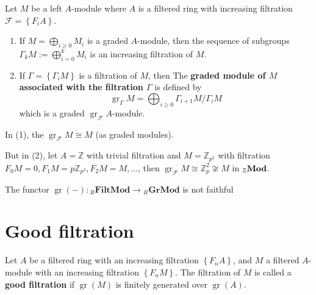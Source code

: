\documentclass[12pt, oneside]{book}
\begin{document}
\begin{proposition}
    Let $M$ be a left $A$-module where $A$ is a filtered ring with increasing filtration $\mathcal{F}=\left\{F_iA\right\}$.
    \begin{enumerate}
        \item
              If $M=\bigoplus_{i\geq 0} M_i$ is a graded $A$-module, then the sequence of subgroups $\Gamma_kM:=\bigoplus_{i=0}^k M_i$ is an increasing filtration of $M$.
        \item
              If $\Gamma=\left\{\Gamma_iM\right\}$ is a filtration of $M$, then
              The \textbf{graded module of $M$ associated with the filtration $\Gamma$} is defined by
              \begin{equation*}
                  \operatorname{gr}_{\Gamma}M
                  =
                  \bigoplus_{i\geq 0} \Gamma_{i+1}M / \Gamma_i M
              \end{equation*}
              which is a graded $\operatorname{gr}_{\mathcal{F}}A$-module.
    \end{enumerate}
    \begin{remark}
        In (1), the  $\operatorname{gr}_{\mathcal{F}}M\cong M$ (as graded modules).

        But in (2), let $A=\mathbb{Z}$ with trivial filtration and $M=\mathbb{Z}_{p^2}$ with filtration $F_0M=0, F_1M=p \mathbb{Z}_{p^2}, F_2M=M,\ldots$, then $\operatorname{gr}_{\mathcal{F}}M \cong \mathbb{Z}_p^2\not \cong M$ in ${}_\mathbb{Z}\mathbf{Mod}$.

        The functor $\operatorname{gr}(-):  {}_R \mathbf{FiltMod}\rightarrow {}_R\mathbf{GrMod}$ is not faithful
    \end{remark}
\end{proposition}

\section{Good filtration}
\begin{definition}
    Let $A$ be a filtered ring with an increasing filtration $\left\{F_nA\right\}$, and $M$ a filtered $A$-module with an increasing filtration $\left\{F_nM\right\}$.
    The filtration of $M$ is called a \textbf{good filtration} if $\operatorname{gr}(M)$ is finitely generated over $\operatorname{gr}(A)$.
\end{definition}
\end{document}
